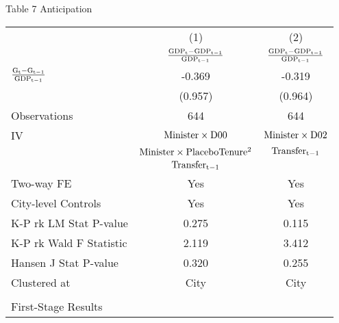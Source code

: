 \documentclass[11pt,a4paper]{article}
\begin{document}
\begin{center}
Table 7 Anticipation\\

\medskip
\begin{scriptsize}
{
\def\sym#1{\ifmmode^{#1}\else\(^{#1}\)\fi}
\begin{tabular}{l*{2}{c}}
\hline\hline
            &\multicolumn{1}{c}{(1)}&\multicolumn{1}{c}{(2)}\\
            &\multicolumn{1}{c}{$\rm \frac{ GDP_{t}-GDP_{t-1}}{GDP_{t-1}}$}&\multicolumn{1}{c}{$\rm \frac{ GDP_{t}-GDP_{t-1}}{GDP_{t-1}}$}\\
\hline
$\rm \frac{ G_{t}-G_{t-1}}{GDP_{t-1}}$     &     -0.369         &   -0.319       \\
            &  (0.957)    &    (0.964)           \\
\hline
Observations       &         644         &         644         \\
IV         & ${\rm Minister \times D00}$ &  ${\rm Minister \times D02}$         \\
       &      ${\rm Minister \times PlaceboTenure^2}$        &  $\rm Transfer_{t-1}$    \\
       &               $\rm Transfer_{t-1}$       &     \\
Two-way FE    &   Yes   & Yes     \\
City-level Controls &   Yes         &  Yes         \\
K-P rk LM Stat P-value          &     0.275         &        0.115          \\
K-P rk Wald F Statistic      &        2.119       &      3.412           \\
Hansen J Stat P-value    &     0.320         &       0.255   \\
Clustered at    &        City       &        City         \\
\hline\hline

\\
First-Stage Results  &   &    \\
[0.5em]


\end{tabular}}
\end{scriptsize}
\end{center}
\end{document}
